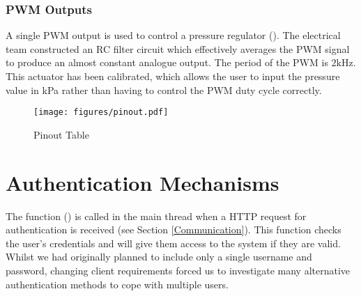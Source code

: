\subsubsection{PWM Outputs}

A single PWM output is used to control a pressure regulator (). The electrical team constructed an RC filter circuit which effectively averages the PWM signal to produce an almost constant analogue output. The period of the PWM is $2\text{kHz}$. This actuator has been calibrated, which allows the user to input the pressure value in kPa rather than having to control the PWM duty cycle correctly.


\begin{figure}[H]
	\centering
	\texttt{[image: figures/pinout.pdf]}
	\caption{Pinout Table} 
	\label{pinout.pdf}
\end{figure}


\section{Authentication Mechanisms}\label{Authentication Mechanisms}

The  function () is called in the main thread when a HTTP request for authentication is received (see Section \ref{Communication}). This function checks the user's credentials and will give them access to the system if they are valid. Whilst we had originally planned to include only a single username and password, changing client requirements forced us to investigate many alternative authentication methods to cope with multiple users.

